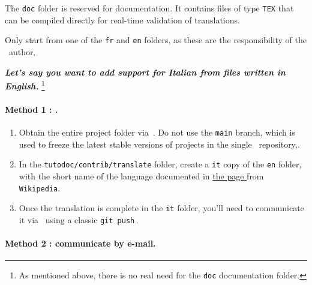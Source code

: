\begin{tdocnote}
    The \verb#doc# folder is reserved for documentation. It contains files of type \verb#TEX# that can be compiled directly for real-time validation of translations.
\end{tdocnote}


\begin{tdocwarn}
    Only start from one of the \verb#fr# and \verb#en# folders, as these are the responsibility of the \thisproj\ author.
\end{tdocwarn}


\medskip


\emph{\textbf{Let's say you want to add support for Italian from files written in English.}}%
\footnote{
    As mentioned above, there is no real need for the \texttt{doc} documentation folder.
}


\paragraph{Method 1 : \git.}

\begin{enumerate}
      \item Obtain the entire project folder via \thisrepo\,.
    Do not use the \verb#main# branch, which is used to freeze the latest stable versions of projects in the single \thismonorepo\ repository,.

      \item In the \verb#tutodoc/contrib/translate# folder, create a \verb#it# copy of the \verb#en# folder, with the short name of the language documented in
      \href{https://en.wikipedia.org/wiki/IETF_language_tag#List_of_common_primary_language_subtags}%
           {the page }
      from \texttt{Wikipedia}.

      \item Once the translation is complete in the \verb#it# folder, you'll need to communicate it via \thisrepo\ using a classic \verb#git push#\,.
\end{enumerate}


\paragraph{Method 2 : communicate by e-mail.}

